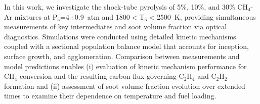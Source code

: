 In this work, we investigate the shock-tube pyrolysis of 5\%, 10\%, and 30\% $\mathrm{CH_4}$-Ar mixtures at  P$_5$=4$\pm$0.9~atm and 1800$<$T$_5$$<$2500~K, providing simultaneous measurements of key intermediates and soot volume fraction via optical diagnostics. Simulations were conducted using detailed kinetic mechanisms coupled with a sectional population balance model that accounts for inception, surface growth, and agglomeration. Comparison between measurements and model predictions enables (i) evaluation of kinetic mechanism performance for $\mathrm{CH_4}$ conversion and the resulting carbon flux governing $\mathrm{C_2H_4}$ and $\mathrm{C_2H_2}$ formation and (ii) assessment of soot volume fraction evolution over extended times to examine their dependence on temperature and fuel loading.
